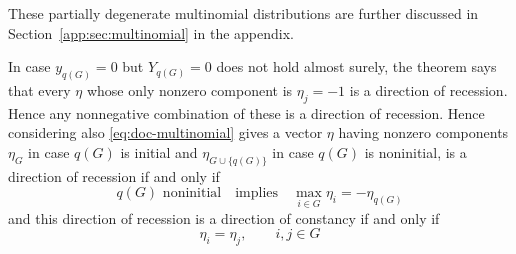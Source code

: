 These partially degenerate multinomial distributions are further
discussed in Section~\ref{app:sec:multinomial} in the appendix.

In case $y_{q(G)} = 0$ but $Y_{q(G)} = 0$ does not hold almost surely,
the theorem says that every $\eta$ whose only nonzero component is
$\eta_j = -1$ is a direction of recession.  Hence any nonnegative
combination of these is a direction of recession.  Hence considering
also \eqref{eq:doc-multinomial} gives a vector $\eta$ having nonzero
components $\eta_G$ in case $q(G)$ is initial and $\eta_{G \cup \{q(G)\}}$
in case $q(G)$ is noninitial, is a direction of recession if and only if
$$
    \text{$q(G)$ noninitial} \quad \text{implies} \quad 
    \max_{i \in G} \eta_i = - \eta_{q(G)}
$$
and this direction of recession is a direction of constancy if and only if
$$
    \eta_i = \eta_j, \qquad i, j \in G
$$

